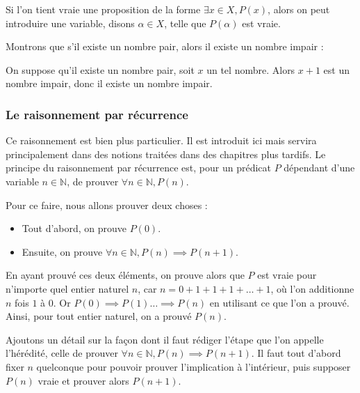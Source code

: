 Si l'on tient vraie une proposition de la forme $\exists x\in X, P(x)$, alors on peut introduire une variable, disons $\alpha\in X$, telle que $P(\alpha)$ est vraie.

\begin{expl}
    Montrons que s'il existe un nombre pair, alors il existe un nombre impair :
    
    On suppose qu'il existe un nombre pair, soit $x$ un tel nombre. Alors $x+1$ est un nombre impair, donc il existe un nombre impair.
\end{expl}

\subsubsection{Le raisonnement par récurrence}

Ce raisonnement est bien plus particulier. Il est introduit ici mais servira principalement dans des notions traitées dans des chapitres plus tardifs. Le principe du raisonnement par récurrence est, pour un prédicat $P$ dépendant d'une variable $n\in\mathbb N$, de prouver $\forall n \in\mathbb N, P(n)$.

Pour ce faire, nous allons prouver deux choses :
\begin{itemize}[label=$\bullet$]
    \item Tout d'abord, on prouve $P(0)$.
    \item Ensuite, on prouve $\forall n\in\mathbb N, P(n)\implies P(n+1)$.
\end{itemize}

En ayant prouvé ces deux éléments, on prouve alors que $P$ est vraie pour n'importe quel entier naturel $n$, car $n=0+1+1+1+\ldots+1$, où l'on additionne $n$ fois $1$ à $0$. Or $P(0)\implies P(1)\ldots \implies P(n)$ en utilisant ce que l'on a prouvé. Ainsi, pour tout entier naturel, on a prouvé $P(n)$.

\begin{rmk}
    Ajoutons un détail sur la façon dont il faut rédiger l'étape que l'on appelle l'hérédité, celle de prouver $\forall n \in \mathbb N, P(n)\implies P(n+1)$. Il faut tout d'abord fixer $n$ quelconque pour pouvoir prouver l'implication à l'intérieur, puis supposer $P(n)$ vraie et prouver alors $P(n+1)$.
\end{rmk}

